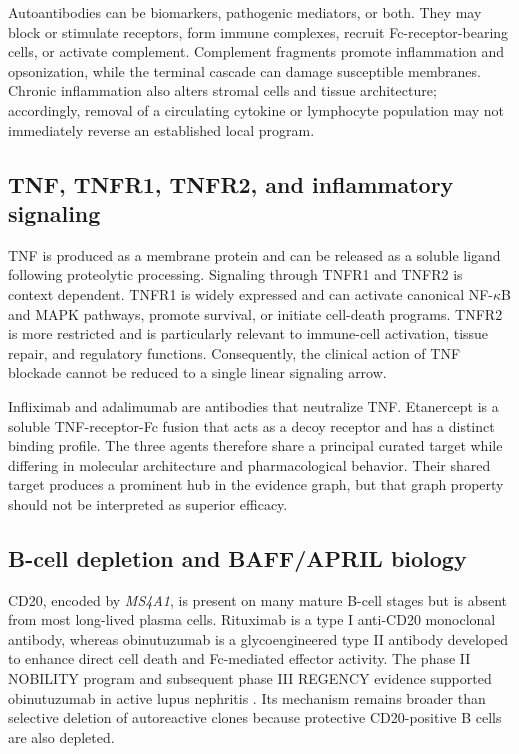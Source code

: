 \documentclass[12pt,a4paper]{article}
\begin{document}
Autoantibodies can be biomarkers, pathogenic mediators, or both. They may block or stimulate receptors, form immune complexes, recruit Fc-receptor-bearing cells, or activate complement. Complement fragments promote inflammation and opsonization, while the terminal cascade can damage susceptible membranes. Chronic inflammation also alters stromal cells and tissue architecture; accordingly, removal of a circulating cytokine or lymphocyte population may not immediately reverse an established local program.

\subsection{TNF, TNFR1, TNFR2, and inflammatory signaling}
TNF is produced as a membrane protein and can be released as a soluble ligand following proteolytic processing. Signaling through TNFR1 and TNFR2 is context dependent. TNFR1 is widely expressed and can activate canonical NF-\(\kappa\)B and MAPK pathways, promote survival, or initiate cell-death programs. TNFR2 is more restricted and is particularly relevant to immune-cell activation, tissue repair, and regulatory functions. Consequently, the clinical action of TNF blockade cannot be reduced to a single linear signaling arrow.

Infliximab and adalimumab are antibodies that neutralize TNF. Etanercept is a soluble TNF-receptor-Fc fusion that acts as a decoy receptor and has a distinct binding profile. The three agents therefore share a principal curated target while differing in molecular architecture and pharmacological behavior. Their shared target produces a prominent hub in the evidence graph, but that graph property should not be interpreted as superior efficacy.

\subsection{B-cell depletion and BAFF/APRIL biology}
CD20, encoded by \textit{MS4A1}, is present on many mature B-cell stages but is absent from most long-lived plasma cells. Rituximab is a type I anti-CD20 monoclonal antibody, whereas obinutuzumab is a glycoengineered type II antibody developed to enhance direct cell death and Fc-mediated effector activity. The phase II NOBILITY program and subsequent phase III REGENCY evidence supported obinutuzumab in active lupus nephritis \cite{furie2022nobility,furie2025regency}. Its mechanism remains broader than selective deletion of autoreactive clones because protective CD20-positive B cells are also depleted.
\end{document}
